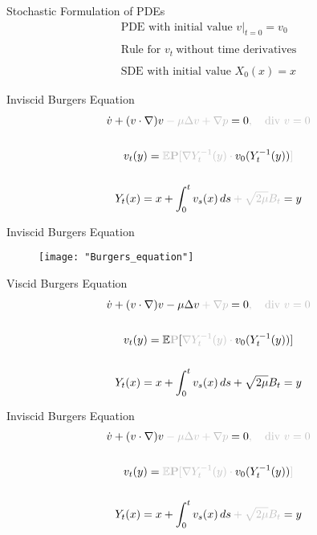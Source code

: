 \documentclass{beamer}
\theoremstyle{plain}
\theoremstyle{definition}
\theoremstyle{remark}
\newcommand{\1}{\mathbbm{1}}
\begin{document}
\begin{frame}{Stochastic Formulation of PDEs}
\begin{gather*}
\text{PDE with initial value } v|_{t=0}=v_0\\
\quad\\
\text{Rule for } v_t \ \text{without time derivatives}\\
\quad\\
\text{SDE with initial value } X_0(x)=x
\end{gather*}
\end{frame}

\begin{frame}{Inviscid Burgers Equation}
\begin{gather*}
\dot{v}+(v\cdot \nabla)v \color{lightgray} - \mu \Delta v + \nabla p \color{black} = 0 \color{lightgray},  \quad \text{div} \ v = 0 \\
\quad\\
v_t(y) = \color{lightgray} \mathbb{E} \textbf{P} [ \nabla Y_t^{-1}(y) \cdot \color{black} v_0(Y_t^{-1}(y))\color{lightgray}]\\
\quad \\
Y_t(x) = x + \int_0^t v_s(x) \, ds  \color{lightgray} + \sqrt{2\mu} B_t \color{black} = y
\end{gather*}
\end{frame}


\begin{frame}{Inviscid Burgers Equation}
\begin{figure}[h]
 \centering
\texttt{[image: "Burgers\_equation"]}
\end{figure}
\end{frame}


\begin{frame}{Viscid Burgers Equation}
\begin{gather*}
\dot{v}+(v\cdot \nabla)v - \mu \Delta v \color{lightgray} + \nabla p \color{black} = 0 \color{lightgray} ,  \quad \text{div} \ v = 0 \\
\quad\\
v_t(y) = \mathbb{E} \color{lightgray} \textbf{P} \color{black}[ \color{lightgray} \nabla Y_t^{-1}(y) \cdot \color{black} v_0(Y_t^{-1}(y))]\\
\quad \\
Y_t(x) = x + \int_0^t v_s(x) \, ds  + \sqrt{2\mu} B_t \color{black} = y
\end{gather*}
\end{frame}


\begin{frame}{Inviscid Burgers Equation}
\begin{gather*}
\dot{v}+(v\cdot \nabla)v \color{lightgray} - \mu \Delta v + \nabla p \color{black} = 0 \color{lightgray},  \quad \text{div} \ v = 0 \\
\quad\\
v_t(y) = \color{lightgray} \mathbb{E}  \textbf{P} [ \nabla Y_t^{-1}(y) \cdot \color{black} v_0(Y_t^{-1}(y))\color{lightgray}]\\
\quad \\
Y_t(x) = x + \int_0^t v_s(x) \, ds  \color{lightgray} + \sqrt{2\mu} B_t \color{black} = y
\end{gather*}
\end{frame}
\end{document}
